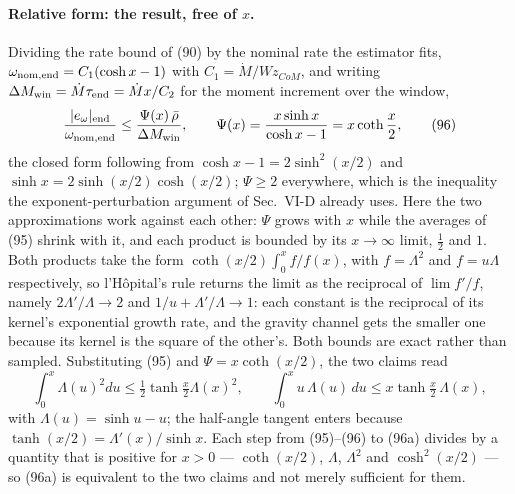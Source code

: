 \documentclass[10pt]{article}
\newcommand{\Wz}{W\!z_{CoM}}
\begin{document}
\paragraph{Relative form: the result, free of $x$.}
Dividing the rate bound of (90) by the nominal rate the estimator
fits, $\omega_{\rm nom,end} = C_1(\cosh x - 1)$ with
$C_1 = \dot M/\Wz$, and writing
$\Delta M_{\rm win} = \dot M\tau_{\rm end} = \dot M x/C_2$ for the
moment increment over the window,
\begin{equation}
  \frac{|e_\omega|_{\rm end}}{\omega_{\rm nom,end}}
  \le \frac{\Psi(x)\,\bar\rho}{\Delta M_{\rm win}},
  \qquad
  \Psi(x) = \frac{x\sinh x}{\cosh x - 1} = x\coth\frac{x}{2} ,
  \tag{96}
\end{equation}
the closed form following from $\cosh x - 1 = 2\sinh^2(x/2)$ and
$\sinh x = 2\sinh(x/2)\cosh(x/2)$; $\Psi \ge 2$ everywhere, which is
the inequality the exponent-perturbation argument of Sec.~VI-D already
uses. Here the two approximations work against each other: $\Psi$
grows with $x$ while the averages of (95) shrink with it, and each
product is bounded by its $x\to\infty$ limit, $\tfrac12$ and $1$. Both
products take the form $\coth(x/2)\int_0^x\!f/f(x)$, with $f =
\Lambda^2$ and $f = u\Lambda$ respectively, so l'H\^opital's rule
returns the limit as the reciprocal of $\lim f'/f$, namely
$2\Lambda'/\Lambda\to2$ and $1/u + \Lambda'/\Lambda\to1$: each constant
is the reciprocal of its kernel's exponential growth rate, and the
gravity channel gets the smaller one because its kernel is the square
of the other's. Both bounds are exact rather than sampled.
Substituting (95) and
$\Psi = x\coth(x/2)$, the two claims read
\begin{equation}
  \int_0^x\!\Lambda(u)^2du \le \tfrac12\tanh\tfrac{x}{2}\Lambda(x)^2,
  \qquad
  \int_0^x\! u\,\Lambda(u)\,du \le x\tanh\tfrac{x}{2}\,\Lambda(x),
  \tag{96a}
\end{equation}
with $\Lambda(u) = \sinh u - u$; the half-angle tangent enters because
$\tanh(x/2) = \Lambda'(x)/\sinh x$. Each step from (95)--(96) to (96a)
divides by a quantity that is positive for $x>0$ --- $\coth(x/2)$,
$\Lambda$, $\Lambda^2$ and $\cosh^2(x/2)$ --- so (96a) is equivalent to
the two claims and not merely sufficient for them.
\end{document}
